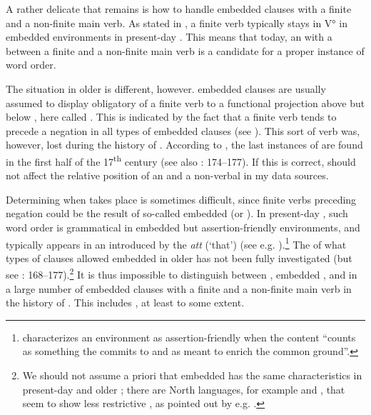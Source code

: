 \documentclass[output=paper, colorlinks, citecolor=brown]{langscibook}
\begin{document}
A rather delicate  that remains is how to handle embedded clauses with a finite  and a non-finite main verb. As stated in , a finite verb typically stays in V° in embedded environments in present-day . This means that today, an  with a  between a finite  and a non-finite main verb is a candidate for a proper instance of  word order.


The situation in older  is different, however.  embedded clauses are usually assumed to display obligatory  of a finite verb to a functional projection above  but below , here called . This is indicated by the fact that a finite verb tends to precede a negation in all types of embedded clauses (see \citealt{Platzack1988emergence,Falk1993,Hakansson2013}). This sort of verb  was, however, lost during the history of . According to \citet{Platzack1988emergence}, the last instances of   are found in the first half of the 17\textsuperscript{th} century (see also \citealt{Falk1993}: 174–177). If this is correct,  should not affect the relative position of an  and a non-verbal  in my data sources.



Determining when  takes place is sometimes difficult, since finite verbs preceding negation could be the result of so-called embedded  (or ). In present-day , such  word order is grammatical in embedded but assertion-friendly environments, and typically appears in an  introduced by the  \textit{att} (‘that’) (see e.g. \citealt{Petersson2014}).\footnote{\citet[4]{Gartner2016} characterizes an environment as assertion-friendly when the content “counts as something the  commits to and as meant to enrich the common ground”.} The  of what types of clauses allowed embedded  in older  has not been fully investigated (but see \citealt{Falk1993}: 168–177).\footnote{We should not assume a priori that embedded  has the same characteristics in present-day and older ; there are North  languages, for example  and , that seem to show less restrictive , as pointed out by e.g. \citet{Gartner2016}.} It is thus impossible to distinguish between , embedded , and  in a large number of embedded clauses with a finite  and a non-finite main verb in the history of . This includes , at least to some extent.
\end{document}
